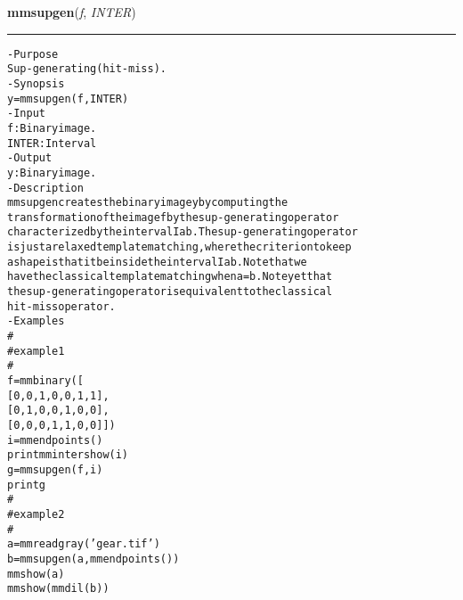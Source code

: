     \begin{boxedminipage}{\textwidth}

    \raggedright \textbf{mmsupgen}(\textit{f}, \textit{INTER})

    \vspace{-1.5ex}

    \rule{\textwidth}{0.5\fboxrule}
\begin{alltt}
- Purpose
    Sup-generating (hit-miss).
- Synopsis
    y = mmsupgen(f, INTER)
- Input
    f:     Binary image.
    INTER: Interval
- Output
    y: Binary image.
- Description
    mmsupgen creates the binary image y by computing the
    transformation of the image f by the sup-generating operator
    characterized by the interval Iab . The sup-generating operator
    is just a relaxed template matching, where the criterion to keep
    a shape is that it be inside the interval Iab . Note that we
    have the classical template matching when a=b . Note yet that
    the sup-generating operator is equivalent to the classical
    hit-miss operator.
- Examples
    \#
    \#   example 1
    \#
    f=mmbinary([
       [0,0,1,0,0,1,1],
       [0,1,0,0,1,0,0],
       [0,0,0,1,1,0,0]])
    i=mmendpoints()
    print mmintershow(i)
    g=mmsupgen(f,i)
    print g
    \#
    \#   example 2
    \#
    a=mmreadgray('gear.tif')
    b=mmsupgen(a,mmendpoints())
    mmshow(a)
    mmshow(mmdil(b))\end{alltt}

    \vspace{1ex}

    \end{boxedminipage}

    \label{multireg:num_pymorph:mmsupgen_old}
    \vspace{0.5ex}


